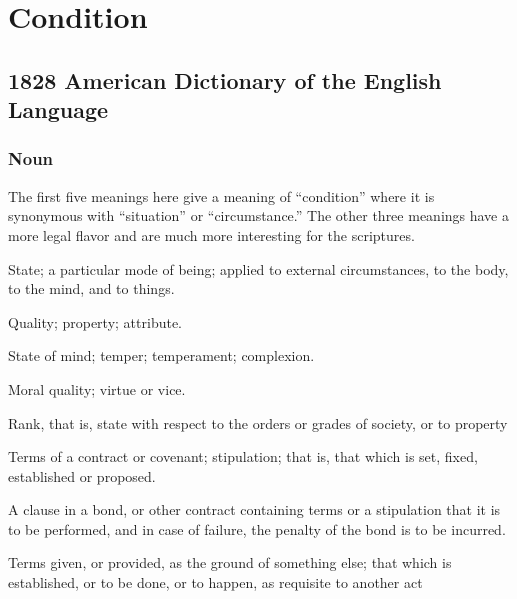 \section{Condition}
	\label{CONDITION}
	

\subsection{1828 American Dictionary of the English Language} %
	\label{CONDITION-1828}
	
	\subsubsection{Noun}
	
		The first five meanings here give a meaning of ``condition'' where it is synonymous with ``situation'' or ``circumstance.'' The other three meanings have a more legal flavor and are much more interesting for the scriptures.

		\begin{compactitem}
			\item[1] State; a particular mode of being; applied to external circumstances, to the body, to the mind, and to things.
			\item[2] Quality; property; attribute.
			\item[3] State of mind; temper; temperament; complexion.
			\item[4] Moral quality; virtue or vice.
			\item[5] Rank, that is, state with respect to the orders or grades of society, or to property
			\item[6] Terms of a contract or covenant; stipulation; that is, that which is set, fixed, established or proposed.
			\item[7] A clause in a bond, or other contract containing terms or a stipulation that it is to be performed, and in case of failure, the penalty of the bond is to be incurred.
			\item[8] Terms given, or provided, as the ground of something else; that which is established, or to be done, or to happen, as requisite to another act
		\end{compactitem}
		
